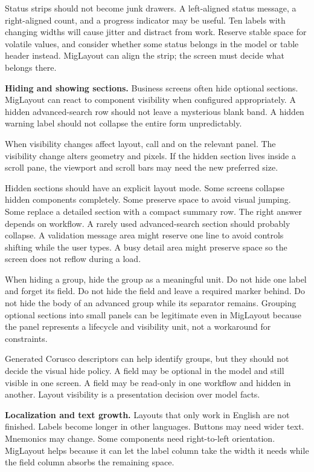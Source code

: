 Status strips should not become junk drawers. A left-aligned status message, a
right-aligned count, and a progress indicator may be useful. Ten labels with
changing widths will cause jitter and distract from work. Reserve stable space
for volatile values, and consider whether some status belongs in the model or
table header instead. MigLayout can align the strip; the screen must decide what
belongs there.

\textbf{Hiding and showing sections.}
Business screens often hide optional sections. MigLayout can react to component visibility when configured appropriately. A hidden advanced-search row should not leave a mysterious blank band. A hidden warning label should not collapse the entire form unpredictably.

When visibility changes affect layout, call  and  on the relevant panel. The visibility change alters geometry and pixels. If the hidden section lives inside a scroll pane, the viewport and scroll bars may need the new preferred size.

Hidden sections should have an explicit layout mode. Some screens collapse
hidden components completely. Some preserve space to avoid visual jumping. Some
replace a detailed section with a compact summary row. The right answer depends
on workflow. A rarely used advanced-search section should probably collapse. A
validation message area might reserve one line to avoid controls shifting while
the user types. A busy detail area might preserve space so the screen does not
reflow during a load.

When hiding a group, hide the group as a meaningful unit. Do not hide one label
and forget its field. Do not hide the field and leave a required marker behind.
Do not hide the body of an advanced group while its separator remains. Grouping
optional sections into small panels can be legitimate even in MigLayout because
the panel represents a lifecycle and visibility unit, not a workaround for
constraints.

Generated Corusco descriptors can help identify groups, but they should not
decide the visual hide policy. A field may be optional in the model and still
visible in one screen. A field may be read-only in one workflow and hidden in
another. Layout visibility is a presentation decision over model facts.

\textbf{Localization and text growth.}
Layouts that only work in English are not finished. Labels become longer in other languages. Buttons may need wider text. Mnemonics may change. Some components need right-to-left orientation. MigLayout helps because it can let the label column take the width it needs while the field column absorbs the remaining space.

